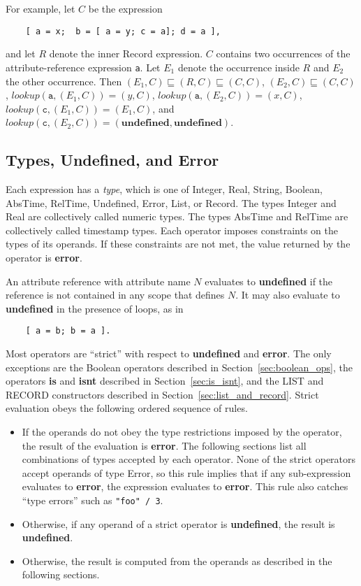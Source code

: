 \documentclass{article}
\begin{document}
\noindent
For example, let $C$ be the expression
\begin{verbatim}
    [ a = x;  b = [ a = y; c = a]; d = a ],
\end{verbatim}
and let $R$ denote the inner Record expression.
$C$ contains two occurrences of the attribute-reference expression \verb/a/.
Let $E_1$ denote the occurrence inside $R$ and $E_2$ the other occurrence.
Then
$(E_1, C) \sqsubseteq (R, C) \sqsubseteq (C, C)$,
$(E_2, C) \sqsubseteq (C, C)$,
$\mathit{lookup}(\mathtt{a}, (E_1, C)) = (y, C)$,
$\mathit{lookup}(\mathtt{a}, (E_2, C)) = (x, C)$,
$\mathit{lookup}(\mathtt{c}, (E_1, C)) = (E_1, C)$, and
$\mathit{lookup}(\mathtt{c}, (E_2, C)) = (\mathbf{undefined},
\mathbf{undefined})$.

\subsection{Types, Undefined, and Error}

Each expression has a \emph{type}, which is one of Integer, Real, String,
Boolean, AbsTime, RelTime, Undefined, Error, List, or Record.
The types Integer and Real are collectively called numeric types.
The types AbsTime and RelTime are collectively called timestamp types.
Each operator imposes constraints on the types of its operands.
If these constraints are not met, the value returned by the operator is
\textbf{error}.

An attribute reference with attribute name $N$ evaluates to
\textbf{undefined} if the reference is not contained in any scope that defines
$N$.
It may also evaluate to \textbf{undefined} in the presence of loops,
as in
\begin{verbatim}
    [ a = b; b = a ].
\end{verbatim}

Most operators are ``strict'' with respect to \textbf{undefined} and
\textbf{error}.
The only exceptions are the Boolean operators described in
Section~\ref{sec:boolean_ops},
the operators \textbf{is} and \textbf{isnt} described in
Section~\ref{sec:is_isnt},
and the LIST and RECORD constructors described in
Section~\ref{sec:list_and_record}.
Strict evaluation obeys the following ordered sequence of rules.
\begin{itemize}
\item If the operands do not obey the type restrictions imposed by the
    operator, the result of the evaluation is \textbf{error}.
    The following sections list all combinations of types accepted by each
    operator.
    None of the strict operators accept operands of type Error, so this rule
    implies that if any sub-expression evaluates to \textbf{error}, the
    expression evaluates to \textbf{error}.
    This rule also catches ``type errors'' such as \texttt{"foo" / 3}.
\item Otherwise, if any operand of a strict operator is \textbf{undefined},
    the result is \textbf{undefined}.
\item Otherwise, the result is computed from the operands as described in the
    following sections.
\end{itemize}
\end{document}
